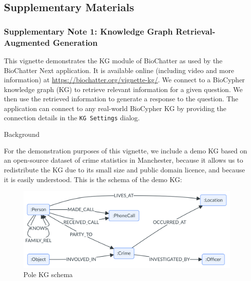 \hypertarget{supplementary-materials}{%
\subsection{Supplementary Materials}\label{supplementary-materials}}

\hypertarget{supplementary-note-1-knowledge-graph-retrieval-augmented-generation}{%
\subsubsection{Supplementary Note 1: Knowledge Graph Retrieval-Augmented Generation}\label{supplementary-note-1-knowledge-graph-retrieval-augmented-generation}}

This vignette demonstrates the KG module of BioChatter as used by the BioChatter
Next application. It is available online (including video and more information)
at \url{https://biochatter.org/vignette-kg/}.
We connect to a BioCypher knowledge graph (KG) to retrieve relevant information
for a given question. We then use the retrieved information to generate a
response to the question. The application can connect to any real-world
BioCypher KG by providing the connection details in the \texttt{KG\ Settings} dialog.

Background

For the demonstration purposes of this vignette, we include a demo KG based on
an open-source dataset of crime statistics in Manchester, because it allows us
to redistribute the KG due to its small size and public domain licence, and
because it is easily understood. This is the schema of the demo KG:

\begin{fignos:no-prefix-figure-caption}

\begin{figure}
\centering
\includegraphics{images/pole-schema.png}
\caption{Pole KG schema}
\end{figure}

\end{fignos:no-prefix-figure-caption}

